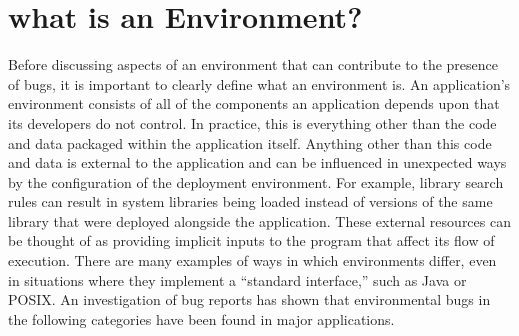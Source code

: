 \section{what is an Environment?}
\label{SEC:background}

Before discussing aspects of an environment that can contribute to the
presence of bugs, it is important to clearly
define what an environment is.
An application's environment consists of
all of the
components an application depends upon that its developers do not control.
In practice, this is everything other than the code and data packaged
within the application itself.  Anything other than this code and data is
external to the application and can be
influenced in unexpected ways by the configuration of the
deployment environment.
For example, library search rules can result in system libraries being
loaded instead of versions of the same library that were
deployed alongside the
application.
These external resources can be thought of as
providing implicit inputs to the program that affect its flow of execution.
There are many examples of ways in which environments differ, even in
situations where they implement a ``standard interface,'' such as Java or
POSIX.
An investigation of bug reports has shown that environmental bugs in the
following categories have been found in major applications.

